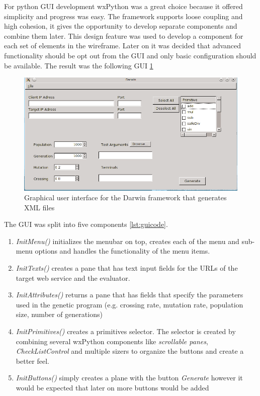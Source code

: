 For python GUI development wxPython was a great choice because it offered simplicity and progress was easy.
The framework supports loose coupling and high cohesion, it gives the opportunity to develop separate components
and combine them later. This design feature was used to develop a component for each set of elements in the
wireframe. Later on it was decided that advanced functionality should be opt out from the GUI and only
basic configuration should be available. The result was the following GUI \ref{fig:guiimp}

\begin{figure}[htp]
\centering
\includegraphics[scale=0.7]{Figures/gui.png}
\caption{Graphical user interface for the Darwin framework that generates XML files}
\label{fig:guiimp}
\end{figure}

The GUI was split into five components \ref{lst:guicode}.

\begin{enumerate}
	\item \textit{InitMenu()} initializes the menubar on top, creates each of the menu and sub-menu options and 
	handles the functionality of the menu items.
	\item \textit{InitTexts()} creates a pane that has text input fields for the URLs of the target web service and 
	the evaluator.
	\item \textit{InitAttributes()} returns a pane that has fields that specify the parameters used in the genetic program (e.g. crossing rate, mutation rate, population size, number of generations)
	\item \textit{InitPrimitives()} creates a primitives selector. The selector is created by combining several wxPython components like \textit{scrollable panes}, \textit{CheckListControl} and multiple
	sizers to organize the buttons and create a better feel.
	\item \textit{InitButtons()} simply creates a plane with the button \textit{Generate} however it would be expected that later on more buttons would be added
\end{enumerate} 

